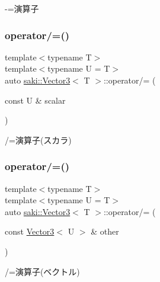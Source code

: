 -\/=演算子 

\mbox{\label{classsaki_1_1_vector3_aacf8494aa9c503f70bad8039e1f926b9}} 
\subsubsection{\texorpdfstring{operator/=()}{operator/=()}\hspace{0.1cm}{\footnotesize\ttfamily [1/2]}}
{\footnotesize\ttfamily template$<$typename T$>$ \\
template$<$typename U  = T$>$ \\
auto \mbox{\hyperlink{classsaki_1_1_vector3}{saki\+::\+Vector3}}$<$ T $>$\+::operator/= (\begin{DoxyParamCaption}\item[{const U \&}]{scalar }\end{DoxyParamCaption})\hspace{0.3cm}{\ttfamily [inline]}}



/=演算子(スカラ) 

\mbox{\label{classsaki_1_1_vector3_a65eeb9e82784752ccde12b72a33da67e}} 
\subsubsection{\texorpdfstring{operator/=()}{operator/=()}\hspace{0.1cm}{\footnotesize\ttfamily [2/2]}}
{\footnotesize\ttfamily template$<$typename T$>$ \\
template$<$typename U  = T$>$ \\
auto \mbox{\hyperlink{classsaki_1_1_vector3}{saki\+::\+Vector3}}$<$ T $>$\+::operator/= (\begin{DoxyParamCaption}\item[{const \mbox{\hyperlink{classsaki_1_1_vector3}{Vector3}}$<$ U $>$ \&}]{other }\end{DoxyParamCaption})\hspace{0.3cm}{\ttfamily [inline]}}



/=演算子(ベクトル) 

